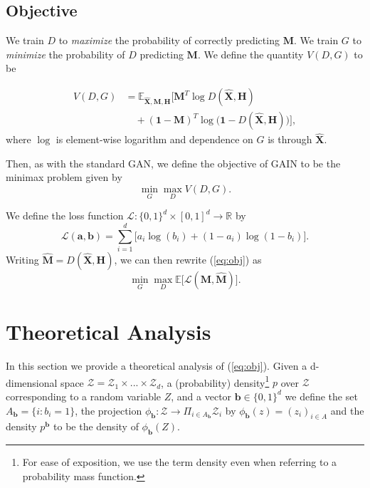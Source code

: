 \documentclass{article}
\begin{document}
\subsection{Objective}
We train $D$ to {\em maximize} the probability of correctly predicting $\mathbf{M}$. We train $G$ to {\em minimize} the probability of $D$ predicting $\mathbf{M}$. We define the quantity $V(D, G)$ to be

\begin{align} \label{eq:V}
V(D, G) &= \mathbb{E}_{\hat{\mathbf{X}}, \mathbf{M}, \mathbf{H}}\Big[\mathbf{M}^T \log D(\hat{\mathbf{X}}, \mathbf{H}) \\\nonumber
&\quad+ (\mathbf{1 - M})^T \log\big(\mathbf{1} - D(\hat{\mathbf{X}}, \mathbf{H})\big)\Big],
\end{align}
where $\log$ is element-wise logarithm and dependence on $G$ is through $\hat{\mathbf{X}}$.

Then, as with the standard GAN, we define the objective of GAIN to be the minimax problem given by
\begin{equation}\label{eq:obj}
\min_{G} \max_{D} V(D, G).
\end{equation}

We define the loss function $\mathcal{L} : \{0,1\}^d \times [0, 1]^d \to \mathbb{R}$ by
\begin{equation} \label{eq:loss}
\mathcal{L}(\mathbf{a},\mathbf{b})=\sum_{i=1}^{d}\Big[a_i\log(b_i)+(1-a_{i})\log(1-b_i)\Big].
\end{equation}
Writing $\hat{\mathbf{M}} = D(\hat{\mathbf{X}}, \mathbf{H})$, we can then rewrite (\ref{eq:obj}) as
\begin{equation} \label{eq:reform}
\min_G\max_D \mathbb{E}\big[\mathcal{L}(\mathbf{M}, \hat{\mathbf{M}})\big].
\end{equation}

\section{Theoretical Analysis} \label{sec:theory}
In this section we provide a theoretical analysis of (\ref{eq:obj}). Given a d-dimensional space $\mathcal{Z} = \mathcal{Z}_1 \times ... \times \mathcal{Z}_d$, a (probability) density\footnote{For ease of exposition, we use the term density even when referring to a probability mass function.} $p$ over $\mathcal{Z}$ corresponding to a random variable $Z$, and a vector $\mathbf{b} \in \{0, 1\}^d$ we define the set $A_{\mathbf{b}} = \{i : b_i = 1\}$, the projection $\phi_{\mathbf{b}} : \mathcal{Z} \to \Pi_{i \in A_{\mathbf{b}}} \mathcal{Z}_i$ by $\phi_{\mathbf{b}}(z) = (z_i)_{i \in A}$ and the density $p^{\mathbf{b}}$ to be the density of $\phi_{\mathbf{b}}(Z)$.
\end{document}
